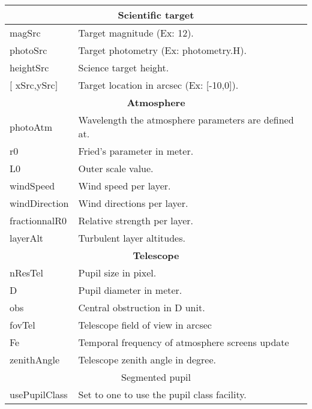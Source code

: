 \documentclass[12pt]{article}
\begin{document}
\begin{table}[H]	
	\centering
\begin{scriptsize}
	\begin{tabular}{p{2.25cm}p{5cm}}	
		\hline 
		\multicolumn{2}{c}{\textbf{Scientific target}} \\
		\hline
		magSrc & Target magnitude (Ex: 12).\\                                
		photoSrc & Target photometry (Ex: photometry.H).\\
		heightSrc & Science target height.\\                     		           
		$[$ xSrc,ySrc$]$  & Target location in arcsec (Ex: [-10,0]).\\  			
		\hline
		\multicolumn{2}{c}{\textbf{Atmosphere}} \\
		\hline
		photoAtm            & Wavelength the atmosphere parameters are defined at.\\                    
		r0                  & Fried's parameter in meter.\\                          
		L0                  & Outer scale value.\\                               
		windSpeed           & Wind speed per layer.\\                 
		windDirection       & Wind directions per layer.\\               
		fractionnalR0       & Relative strength per layer.\\     
		layerAlt            & Turbulent layer altitudes.\\     				
		\hline
		\multicolumn{2}{c}{\textbf{Telescope}} \\
		\hline
		nResTel      & Pupil size in pixel.\\
		D            & Pupil diameter in meter.\\                            
		obs    		& Central obstruction in D unit.\\                           
		fovTel 		& Telescope field of view in arcsec\\                              
		Fe   		& Temporal frequency of atmosphere screens update\\                              
		zenithAngle  & Telescope zenith angle in degree.\\    
		\hline
		\multicolumn{2}{c}{Segmented pupil} \\				                            
	    \hline
	    usePupilClass & Set to one to use the pupil class facility.\\

\end{tabular}
\end{scriptsize}
\end{table}
\end{document}
